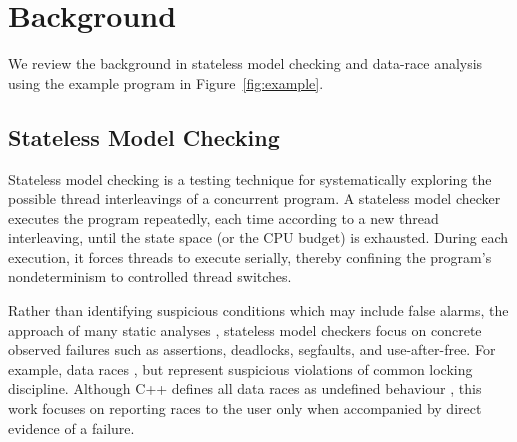\section{Background}
\label{sec:overview}

We review the background in stateless model checking and data-race analysis using the example program in Figure~\ref{fig:example}.

\subsection{Stateless Model Checking}
\label{sec:overview-sssmc}

Stateless model checking \cite{verisoft} is a testing technique for systematically exploring the possible thread interleavings of a concurrent program.
A stateless model checker executes the program repeatedly, each time according to a new thread interleaving, until the state space (or the CPU budget) is exhausted.
During each execution, it forces threads to execute serially, thereby confining the program's nondeterminism to controlled thread switches.

Rather than identifying suspicious conditions which may include false alarms, the approach of many static analyses \cite{racerx,coverity},
stateless model checkers focus on concrete observed failures such as assertions, deadlocks, segfaults, and use-after-free.
For example, data races , but represent suspicious violations of common locking discipline.
Although C++ defines all data races as undefined behaviour \cite{boehm-memorymodels},
this work focuses on reporting races to the user only when accompanied by direct evidence of a failure.

